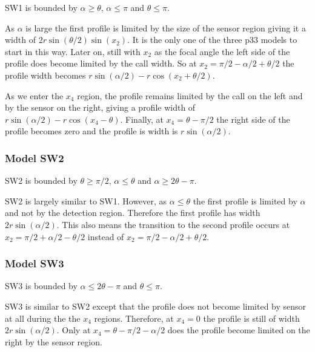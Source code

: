 SW1 is bounded by $\alpha \ge \theta$, $\alpha \le\pi$ and $\theta \le \pi$.

As $\alpha $ is large the first profile is limited by the size of the sensor region giving it a width of $2r\sin\left(\theta/2\right)\sin(x_2)$. It is the only one of the three p33 models to start in this way. Later on, still with $x_2$ as the focal angle the left side of the profile does become limited by the call width. So at $x_2= \pi/2 - \alpha/2 + \theta/2$ the profile width becomes $r\sin(\alpha/2) - r\cos(x_2 + \theta/2)$. 

As we enter the $x_4$ region, the profile remains limited by the call on the left and by the sensor on the right, giving a profile width of  $r\sin (\alpha /2) -r\cos(x_4-\theta) $. Finally, at $x_4 = \theta - \pi/2$ the right side of the profile becomes zero and the profile is width is $r\sin(\alpha /2)$.



\subsubsection{Model SW2} \label{SW2}

SW2 is bounded by $\theta \ge \pi/2$, $\alpha \le \theta$ and $\alpha \ge 2\theta -\pi$.

SW2 is largely similar to SW1. However, as $\alpha \le \theta$ the first profile is limited by $\alpha$ and not by the detection region. Therefore the first profile has width $2r\sin(\alpha /2)$. This also means the transition to the second profile occurs at  $x_2 = \pi/2 + \alpha/2 - \theta/2$ instead of  $x_2 = \pi/2 - \alpha/2 + \theta/2$.





\subsubsection{Model SW3} \label{SW3}

SW3 is bounded by $\alpha \le 2\theta -\pi$ and $\theta \le \pi$.

SW3 is similar to SW2 except that the profile does not become limited by sensor at all during the the $x_4$ regions. Therefore, at $x_4 = 0 $ the profile is still of width $2r\sin(\alpha /2)$. Only at $x_4 = \theta - \pi/2 - \alpha/2$ does the profile become limited on the right by the sensor region.



